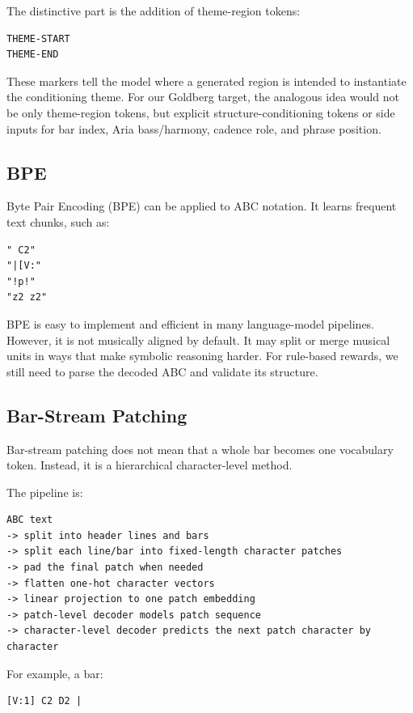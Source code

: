 \documentclass[11pt]{article}
\begin{document}
The distinctive part is the addition of theme-region tokens:

\begin{verbatim}
THEME-START
THEME-END
\end{verbatim}

These markers tell the model where a generated region is intended to instantiate
the conditioning theme. For our Goldberg target, the analogous idea would not be
only theme-region tokens, but explicit structure-conditioning tokens or side
inputs for bar index, Aria bass/harmony, cadence role, and phrase position.

\subsection{BPE}

Byte Pair Encoding (BPE) can be applied to ABC notation. It learns frequent text
chunks, such as:

\begin{verbatim}
" C2"
"|[V:"
"!p!"
"z2 z2"
\end{verbatim}

BPE is easy to implement and efficient in many language-model pipelines. However,
it is not musically aligned by default. It may split or merge musical units in
ways that make symbolic reasoning harder. For rule-based rewards, we still need
to parse the decoded ABC and validate its structure.

\subsection{Bar-Stream Patching}

Bar-stream patching does not mean that a whole bar becomes one vocabulary token.
Instead, it is a hierarchical character-level method.

The pipeline is:

\begin{verbatim}
ABC text
-> split into header lines and bars
-> split each line/bar into fixed-length character patches
-> pad the final patch when needed
-> flatten one-hot character vectors
-> linear projection to one patch embedding
-> patch-level decoder models patch sequence
-> character-level decoder predicts the next patch character by character
\end{verbatim}

For example, a bar:

\begin{verbatim}
[V:1] C2 D2 |
\end{verbatim}
\end{document}
